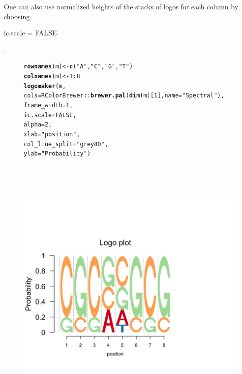 \documentclass[12pt]{article}\usepackage[]{graphicx}\usepackage[usenames,dvipsnames]{color}
\makeatletter
\newcommand{\hlnum}[1]{\textcolor[rgb]{0.686,0.059,0.569}{#1}}%
\newcommand{\hlstr}[1]{\textcolor[rgb]{0.192,0.494,0.8}{#1}}%
\newcommand{\hlopt}[1]{\textcolor[rgb]{0,0,0}{#1}}%
\newcommand{\hlstd}[1]{\textcolor[rgb]{0.345,0.345,0.345}{#1}}%
\newcommand{\hlkwb}[1]{\textcolor[rgb]{0.69,0.353,0.396}{#1}}%
\newcommand{\hlkwc}[1]{\textcolor[rgb]{0.333,0.667,0.333}{#1}}%
\newcommand{\hlkwd}[1]{\textcolor[rgb]{0.737,0.353,0.396}{\textbf{#1}}}%
\newenvironment{kframe}{%
 \def\at@end@of@kframe{}%
 \ifinner\ifhmode%
  \def\at@end@of@kframe{\end{minipage}}%
  \begin{minipage}{\columnwidth}%
 \fi\fi%
 \def\FrameCommand##1{\hskip\@totalleftmargin \hskip-\fboxsep
 \colorbox{shadecolor}{##1}\hskip-\fboxsep
     \hskip-\linewidth \hskip-\@totalleftmargin \hskip\columnwidth}%
 \MakeFramed {\advance\hsize-\width
   \@totalleftmargin\z@ \linewidth\hsize
   \@setminipage}}%
 {\par\unskip\endMakeFramed%
 \at@end@of@kframe}
\newenvironment{knitrout}{}{} %
\makeatother
\begin{document}
\newpage

One can also use normalized heights of the stacks of logos for each column by choosing \begin{verb} ic.scale = FALSE \end{verb}.

\begin{figure}[h]
\begin{center}
\begin{knitrout}
\color{fgcolor}\begin{kframe}
\begin{alltt}
\hlkwd{rownames}\hlstd{(m)} \hlkwb{<-} \hlkwd{c}\hlstd{(}\hlstr{"A"}\hlstd{,} \hlstr{"C"}\hlstd{,} \hlstr{"G"}\hlstd{,} \hlstr{"T"}\hlstd{)}
\hlkwd{colnames}\hlstd{(m)} \hlkwb{<-} \hlnum{1}\hlopt{:}\hlnum{8}
\hlkwd{logomaker}\hlstd{(m,}
          \hlkwc{cols}\hlstd{= RColorBrewer}\hlopt{::}\hlkwd{brewer.pal}\hlstd{(}\hlkwd{dim}\hlstd{(m)[}\hlnum{1}\hlstd{],}\hlkwc{name} \hlstd{=}\hlstr{"Spectral"}\hlstd{),}
          \hlkwc{frame_width} \hlstd{=} \hlnum{1}\hlstd{,}
          \hlkwc{ic.scale} \hlstd{=} \hlnum{FALSE}\hlstd{,}
          \hlkwc{alpha} \hlstd{=} \hlnum{2}\hlstd{,}
          \hlkwc{xlab}\hlstd{=}\hlstr{"position"}\hlstd{,}
          \hlkwc{col_line_split} \hlstd{=} \hlstr{"grey80"}\hlstd{,}
          \hlkwc{ylab} \hlstd{=} \hlstr{"Probability"}\hlstd{)}
\end{alltt}
\end{kframe}
\includegraphics[width=6in,height=5in]{figure/logolas_use_3-1} 

\end{knitrout}
\end{center}
\end{figure}
\end{document}
